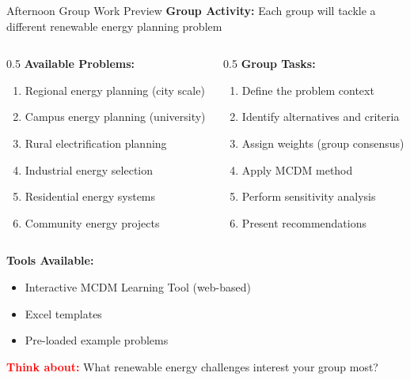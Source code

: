 \documentclass[aspectratio=169]{beamer}
\begin{document}
\begin{frame}{Afternoon Group Work Preview}
\textbf{Group Activity:} Each group will tackle a different renewable energy planning problem

\begin{columns}
\begin{column}{0.5\textwidth}
\textbf{Available Problems:}
\begin{enumerate}
\item Regional energy planning (city scale)
\item Campus energy planning (university)
\item Rural electrification planning
\item Industrial energy selection
\item Residential energy systems
\item Community energy projects
\end{enumerate}
\end{column}
\begin{column}{0.5\textwidth}
\textbf{Group Tasks:}
\begin{enumerate}
\item Define the problem context
\item Identify alternatives and criteria
\item Assign weights (group consensus)
\item Apply MCDM method
\item Perform sensitivity analysis
\item Present recommendations
\end{enumerate}
\end{column}
\end{columns}

\vspace{0.3cm}
\textbf{Tools Available:}
\begin{itemize}
\item Interactive MCDM Learning Tool (web-based)
\item Excel templates
\item Pre-loaded example problems
\end{itemize}

\textcolor{red}{\textbf{Think about:}} What renewable energy challenges interest your group most?
\end{frame}
\end{document}
